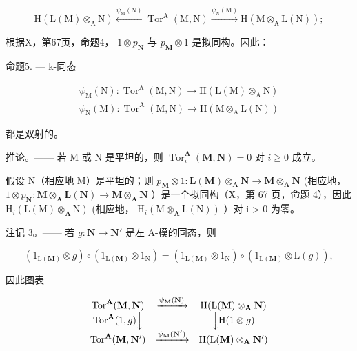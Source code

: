 \[
\mathrm{H} (\mathrm{L} (\mathrm{M}) \otimes_ {\mathrm{A}} \mathrm{N}) \xleftarrow {\psi_ {\mathrm{M}} (\mathrm{N})} \operatorname{Tor} ^ {\mathrm{A}} (\mathrm{M}, \mathrm{N}) \xrightarrow {\overline {{\psi}} _ {\mathrm{N}} (\mathrm{M})} \mathrm{H} (\mathrm{M} \otimes_ {\mathrm{A}} \mathrm{L} (\mathrm{N}));
\]

根据X，第67页，命题4， \(1 \otimes p_{\mathbf{N}}\) 与 \(p_{\mathbf{M}} \otimes 1\) 是拟同构。因此：

命题5. --- k-同态

\[
\begin{array}{l} \psi_ {\mathrm{M}} (\mathrm{N}): \operatorname{Tor} ^ {\mathrm{A}} (\mathrm{M}, \mathrm{N}) \to \mathrm{H} (\mathrm{L} (\mathrm{M}) \otimes_ {\mathrm{A}} \mathrm{N}) \\ \overline {{\psi}} _ {\mathrm{N}} (\mathrm{M}): \operatorname{Tor} ^ {\mathrm{A}} (\mathrm{M}, \mathrm{N}) \to \mathrm{H} (\mathrm{M} \otimes_ {\mathrm{A}} \mathrm{L} (\mathrm{N})) \end{array}
\]

都是双射的。

推论。—— 若 M 或 N 是平坦的，则 \(\operatorname{Tor}_{i}^{\mathbf{A}}(\mathbf{M},\mathbf{N}) = 0\) 对 \(i \geqslant 0\) 成立。

假设 N（相应地 M）是平坦的；则 \(p_{\mathbf{M}} \otimes 1 : \mathbf{L}(\mathbf{M}) \otimes_{\mathbf{A}} \mathbf{N} \to \mathbf{M} \otimes_{\mathbf{A}} \mathbf{N}\) (相应地， \(1 \otimes p_{\mathbf{N}} : \mathbf{M} \otimes_{\mathbf{A}} \mathbf{L}(\mathbf{N}) \to \mathbf{M} \otimes_{\mathbf{A}} \mathbf{N}\) ）是一个拟同构（X，第 67 页，命题 4），因此 \(\mathrm{H}_{i}(\mathrm{L}(\mathrm{M}) \otimes_{\mathbf{A}} \mathrm{N})\) (相应地， \(\mathrm{H}_{i}(\mathrm{M} \otimes_{\mathbf{A}} \mathrm{L}(\mathrm{N}))\) ）对 i \textgreater{} 0 为零。

注记 3。—— 若 \(g: \mathbf{N} \to \mathbf{N}'\) 是左 A-模的同态，则

\[
\left(1 _ {\mathrm{L} (\mathbf {M})} \otimes g\right) \circ \left(1 _ {\mathrm{L} (\mathbf {M})} \otimes 1 _ {\mathrm{N}}\right) = \left(1 _ {\mathrm{L} (\mathbf {M})} \otimes 1 _ {\mathrm{N}}\right) \circ \left(1 _ {\mathrm{L} (\mathbf {M})} \otimes \mathrm{L} (g)\right),
\]

因此图表

\[
\begin{array}{c c c} \operatorname{Tor} ^ {\mathbf {A}} (\mathbf {M}, \mathbf {N}) & \xrightarrow {\psi_ {\mathbf {M}} (\mathbf {N})} & \mathrm{H} (\mathrm{L} (\mathbf {M}) \otimes_ {\mathbf {A}} \mathbf {N}) \\ \operatorname{Tor} ^ {\mathbf {A}} (1, g) \Big \downarrow & & \Big \downarrow \mathrm{H} (1 \otimes g) \\ \operatorname{Tor} ^ {\mathbf {A}} (\mathbf {M}, \mathbf {N} ^ {\prime}) & \xrightarrow {\psi_ {\mathbf {M}} (\mathbf {N} ^ {\prime})} & \mathrm{H} (\mathrm{L} (\mathbf {M}) \otimes_ {\mathbf {A}} \mathbf {N} ^ {\prime}) \end{array}
\]

